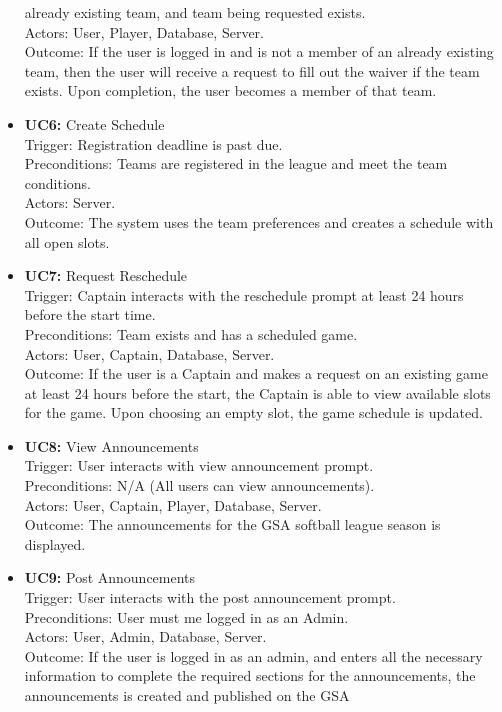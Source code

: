 \documentclass[12pt, titlepage]{article}
\begin{document}
\begin{itemize}
	already existing team, and team being requested exists.\\
	Actors: User, Player, Database, Server.\\
	Outcome: If the user is logged in and is not a member of an already existing team, then
	the user will receive a request to fill out the waiver if the team exists. Upon completion,
	the user becomes a member of that team.
\item \textbf{UC6:} Create Schedule \\
	Trigger: Registration deadline is past due.\\
	Preconditions: Teams are registered in the league and meet the team conditions.\\
	Actors: Server.\\
	Outcome: The system uses the team preferences and creates a schedule with all open slots.
\item \textbf{UC7:} Request Reschedule \\
	Trigger: Captain interacts with the reschedule prompt at least 24 hours before the start time.\\
	Preconditions: Team exists and has a scheduled game.\\
	Actors: User, Captain, Database, Server.\\
	Outcome: If the user is a Captain and makes a request on an existing game at least 24 hours before
	the start, the Captain is able to view available slots for the game. Upon choosing an empty slot, the
	game schedule is updated.
\item \textbf{UC8:} View Announcements \\
	Trigger: User interacts with view announcement prompt.\\
	Preconditions: N/A (All users can view announcements).\\
	Actors: User, Captain, Player, Database, Server.\\
	Outcome: The announcements for the GSA softball league season is displayed.
\item \textbf{UC9:} Post Announcements \\
	Trigger: User interacts with the post announcement prompt.\\
	Preconditions: User must me logged in as an Admin.\\
	Actors: User, Admin, Database, Server.\\
	Outcome: If the user is logged in as an admin, and enters all the necessary information to complete
	the required sections for the announcements, the announcements is created and published on the GSA

\end{itemize}
\end{document}
